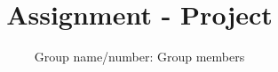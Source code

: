 


    
    \title{Assignment - Project}
    \author{Group name/number: Group members}
    
    \maketitle
    \thispagestyle{empty}
    
    
    
    \newpage
    
    \tableofcontents
    
    \newpage
    
    
    \newpage
    
    
    
    \begin{appendix}
         
    \end{appendix}

